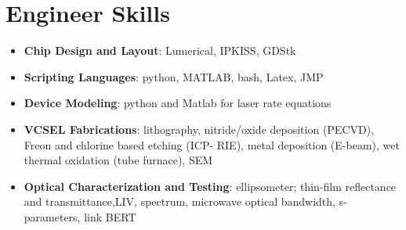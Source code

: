 \documentclass[letterpaper,11pt]{article}
\newcommand{\resumeItem}[2]{
  \item\small{
    \textbf{#1}{: #2 \vspace{-2pt}}
  }
}
\newcommand{\resumeSubItem}[2]{\resumeItem{#1}{#2}\vspace{-4pt}}
\newcommand{\resumeSubHeadingListStart}{\begin{itemize}[leftmargin=*]}
\newcommand{\resumeSubHeadingListEnd}{\end{itemize}}
\begin{document}
\section{Engineer Skills}
  \resumeSubHeadingListStart
    \resumeSubItem{Chip Design and Layout}
      {Lumerical, IPKISS, GDStk}

    \resumeSubItem{Scripting Languages}
      {python, MATLAB, bash, Latex, JMP}

    \resumeSubItem{Device Modeling}
      {python and Matlab for laser rate equations}

    \resumeSubItem{VCSEL Fabrications}
      {lithography, nitride/oxide deposition (PECVD), Freon and chlorine based etching (ICP-
      RIE), metal deposition (E-beam), wet thermal oxidation (tube furnace), SEM}

    \resumeSubItem{Optical Characterization and Testing}
      {ellipsometer; thin-film reflectance and transmittance,LIV, spectrum, microwave optical bandwidth, s-parameters, link BERT}

  \resumeSubHeadingListEnd




\end{document}
